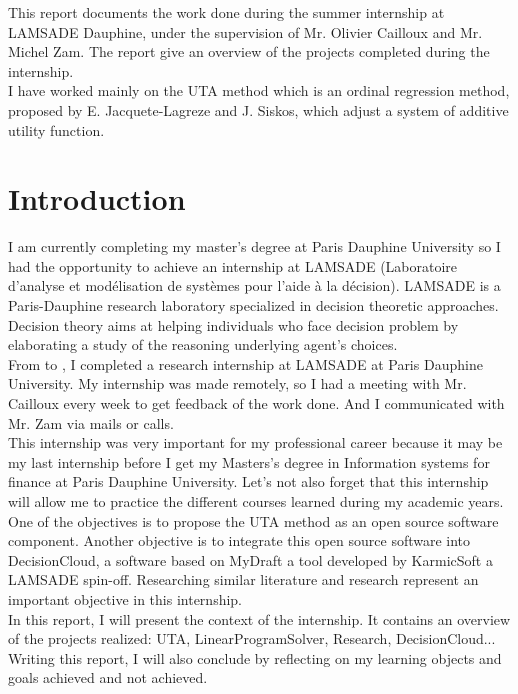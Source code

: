 \documentclass{report}
\begin{document}
\abstract 
This report documents the work done during the summer internship at LAMSADE Dauphine, under the supervision of Mr. Olivier Cailloux and Mr. Michel Zam. The report give an overview of the projects completed during the internship.\\
I have worked mainly on the UTA method which is an ordinal regression method, proposed by E. Jacquete-Lagreze and J. Siskos, which adjust a system of additive utility function.\\
\tableofcontents{}

\chapter{Introduction}
I am currently completing my master's degree at Paris Dauphine University so I had the opportunity to achieve an internship at LAMSADE (Laboratoire d'analyse et modélisation de systèmes pour l'aide à la décision). LAMSADE is a Paris-Dauphine research laboratory specialized in decision theoretic approaches. Decision theory aims at helping individuals who face decision problem by elaborating a study of the reasoning underlying agent's choices. \\

From  to , I completed a research internship at LAMSADE at Paris Dauphine University. My internship was made remotely, so I had a meeting with Mr. Cailloux every week to get feedback of the work done. And I communicated with Mr. Zam via mails or calls. \\

This internship was very important for my professional career because it may be my last internship before I get my Masters's degree in Information systems for finance at Paris Dauphine University. Let's not also forget that this internship will allow me to practice the different courses learned during my academic years.\\

One of the objectives is to propose the UTA method as an open source software component. Another objective is to integrate this open source software into DecisionCloud, a software based on MyDraft a tool developed by KarmicSoft a LAMSADE spin-off. Researching similar literature and research represent an important objective in this internship. \\

In this report, I will present the context of the internship. It contains an overview of the projects realized: UTA, LinearProgramSolver, Research, DecisionCloud... Writing this report, I will also conclude by reflecting on my learning objects and goals achieved and not achieved.\\
\end{document}
